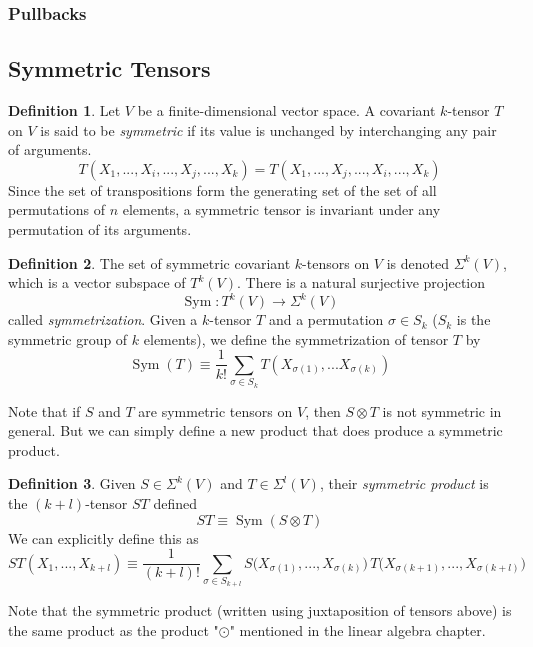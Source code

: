 \documentclass{article}
\DeclareMathOperator{\Sym}{Sym}
\theoremstyle{remark}
\theoremstyle{definition}
\newtheorem{definition}{Definition}[section]
\begin{document}
\subsubsection{Pullbacks}

\subsection{Symmetric Tensors}
\begin{definition}
Let $V$ be a finite-dimensional vector space. A covariant $k$-tensor $T$ on $V$ is said to be \textit{symmetric} if its value is unchanged by interchanging any pair of arguments. 
\[T(X_1,..., X_i, ..., X_j, ..., X_k) = T(X_1,..., X_j, ..., X_i, ..., X_k)\]
Since the set of transpositions form the generating set of the set of all permutations of $n$ elements, a symmetric tensor is invariant under any permutation of its arguments. 
\end{definition}

\begin{definition}
The set of symmetric covariant $k$-tensors on $V$ is denoted $\Sigma^k (V)$, which is a vector subspace of $T^k (V)$. There is a natural surjective projection 
\[\Sym: T^k (V) \longrightarrow \Sigma^k (V)\]
called \textit{symmetrization}. Given a $k$-tensor $T$ and a permutation $\sigma \in S_k$ ($S_k$ is the symmetric group of $k$ elements), we define the symmetrization of tensor $T$ by
\[\Sym(T) \equiv \frac{1}{k!} \sum_{\sigma \in S_k} T (X_{\sigma(1)}, ... X_{\sigma(k)})\]
\end{definition}

Note that if $S$ and $T$ are symmetric tensors on $V$, then $S \otimes T$ is not symmetric in general. But we can simply define a new product that does produce a symmetric product. 

\begin{definition}
Given $S \in \Sigma^k (V)$ and $T \in \Sigma^l (V)$, their \textit{symmetric product} is the $(k+l)$-tensor $ST$ defined
\[S T \equiv \Sym(S \otimes T)\]
We can explicitly define this as 
\[ST(X_1, ..., X_{k+l}) \equiv \frac{1}{(k+l)!} \sum_{\sigma \in S_{k+l}} S\big(X_{\sigma(1)}, ..., X_{\sigma(k)} \big)\, T\big( X_{\sigma(k+1)}, ..., X_{\sigma(k+l)} \big)\]
\end{definition}

Note that the symmetric product (written using juxtaposition of tensors above) is the same product as the product "$\odot$" mentioned in the linear algebra chapter.  
\end{document}
